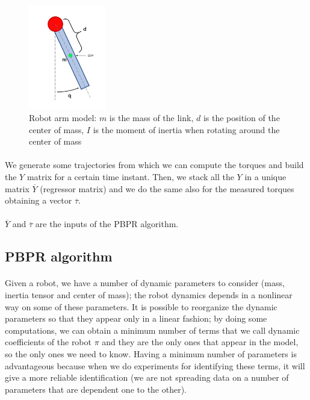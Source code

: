 \documentclass{article}
\begin{document}
\begin{figure}[!htbp]
\centering
\includegraphics[width=0.3\textwidth]{images/1-dof/model.jpeg}
\caption{Robot arm model: $m$ is the mass of the link, $d$ is the position of the center of mass, $I$ is the moment of inertia when rotating around the center of mass}
\end{figure}
\FloatBarrier

\paragraph{} We generate some trajectories from which we can compute the torques and build the $Y$ matrix for a certain time instant. Then, we stack all the $Y$ in a unique matrix $\overline{Y}$ (regressor matrix) and we do the same also for the measured torques obtaining a vector $\overline{\tau}$. \\\\
$\overline{Y}$ and $\overline{\tau}$ are the inputs of the PBPR algorithm.

\subsection{PBPR algorithm}
\paragraph{}Given a robot, we have a number of dynamic parameters to consider (mass, inertia tensor and center of mass); the robot dynamics depends in a nonlinear way on some of these parameters. It is possible to reorganize the dynamic parameters so that they appear only in a linear fashion; by doing some computations, we can obtain a minimum number of terms that we call dynamic coefficients of the robot $\pi$ and they are the only ones that appear in the model, so the only ones we need to know. Having a minimum number of parameters is advantageous because when we do experiments for identifying these terms, it  will give a more reliable identification (we are not spreading data on a number of parameters that are dependent one to the other).
\end{document}
